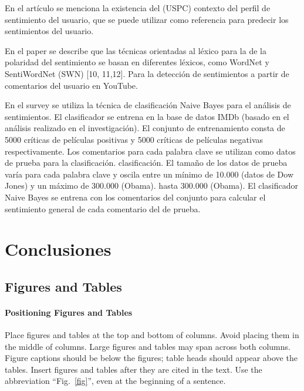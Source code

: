 \documentclass[conference]{IEEEtran}
\begin{document}
 En el artículo \cite{7} se menciona la existencia del (USPC) contexto del perfil de sentimiento
 del usuario, que se puede utilizar como referencia para predecir los sentimientos del usuario.
  
 En el paper \cite{8}  se describe que las técnicas orientadas al léxico para la
 de la polaridad del sentimiento se basan en 
 diferentes léxicos, como WordNet y
 SentiWordNet (SWN) [10, 11,12]. Para la detección de sentimientos a partir de comentarios del usuario en YouTube.

 En el survey \cite{9} se utiliza la técnica de clasificación Naive Bayes para el análisis de sentimientos. El clasificador se entrena en la
 base de datos IMDb (basado en el análisis realizado en el
 investigación). El conjunto de entrenamiento consta de 5000 críticas de películas positivas y
 5000 críticas de películas negativas respectivamente. Los comentarios
 para cada palabra clave se utilizan como datos de prueba para la clasificación.
 clasificación. El tamaño de los datos de prueba varía para cada palabra clave y oscila entre un mínimo de 10.000 (datos de Dow Jones) y un máximo de 300.000 (Obama).
 hasta 300.000 (Obama). El clasificador Naive Bayes se entrena con los comentarios del conjunto
 para calcular el sentimiento general de cada comentario del
 de prueba.

\section{Conclusiones}

\subsection{Figures and Tables}
\paragraph{Positioning Figures and Tables} Place figures and tables at the top and 
bottom of columns. Avoid placing them in the middle of columns. Large 
figures and tables may span across both columns. Figure captions should be 
below the figures; table heads should appear above the tables. Insert 
figures and tables after they are cited in the text. Use the abbreviation 
``Fig.~\ref{fig}'', even at the beginning of a sentence.
\end{document}

